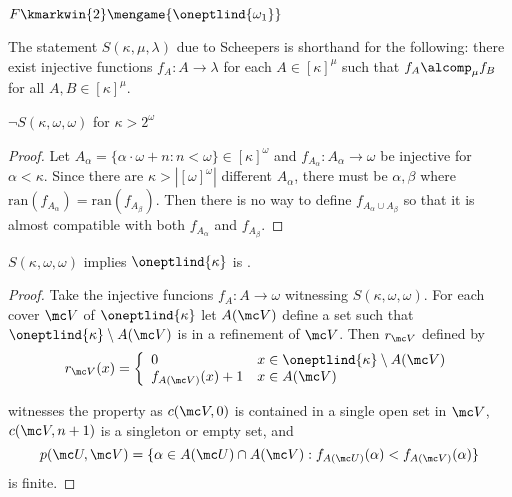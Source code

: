   \begin{cor}
    $F\kmarkwin{2}\mengame{\oneptlind{\omega_1}}$
  \end{cor}

  \begin{defn} 
    The statement $S(\kappa,\mu,\lambda)$ due to Scheepers is shorthand for the following: there exist injective functions $f_A:A\to\lambda$ for each $A\in[\kappa]^\mu$ such that $f_A\alcomp_\mu f_B$ for all $A,B\in[\kappa]^\mu$.
  \end{defn}

  \begin{prop}
    $\neg S(\kappa,\omega,\omega)$ for $\kappa>2^\omega$
  \end{prop}

  \begin{proof}
    Let $A_\alpha=\{\alpha\cdot\omega+n:n<\omega\}\in[\kappa]^\omega$ and $f_{A_\alpha}:A_\alpha\to\omega$ be injective for $\alpha<\kappa$. Since there are $\kappa>|[\omega]^\omega|$ different $A_\alpha$, there must be $\alpha,\beta$ where $\text{ran}(f_{A_\alpha})=\text{ran}(f_{A_\beta})$. Then there is no way to define $f_{A_\alpha\cup A_\beta}$ so that it is almost compatible with both $f_{A_\alpha}$ and $f_{A_\beta}$.
  \end{proof}

  \begin{thm}
    $S(\kappa,\omega,\omega)$ implies $\oneptlind{\kappa}$ is \scish.
  \end{thm}

  \begin{proof}
    Take the injective funcions $f_A:A\to\omega$ witnessing $S(\kappa,\omega,\omega)$. For each cover $\mc V$ of $\oneptlind{\kappa}$ let $A(\mc V)$ define a set such that $\oneptlind{\kappa}\setminus A(\mc V)$ is in a refinement of $\mc V$. Then $r_{\mc V}$ defined by 
      \[
        r_{\mc V}(x) = \left\{
      \begin{array}{ll}
        0 & x\in\oneptlind{\kappa}\setminus A(\mc V) \\
        f_{A(\mc V)}(x)+1 & x\in A(\mc V)
      \end{array}
      \right.
      \] 

    witnesses the property as $c(\mc V,0)$ is contained in a single open set in $\mc V$, $c(\mc V,n+1)$ is a singleton or empty set, and
      \[
        p(\mc U,\mc V) = \{\alpha\in A(\mc U)\cap A(\mc V) : f_{A(\mc U)}(\alpha)<f_{A(\mc V)}(\alpha)\}
      \]
    is finite.
  \end{proof}

